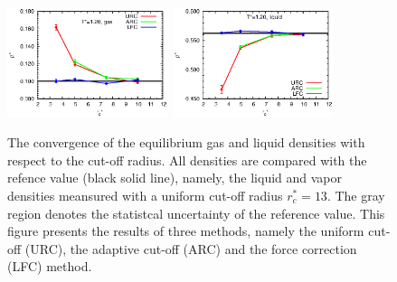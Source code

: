 \documentclass[aps,pre,preprint]{revtex4-1}
\begin{document}
\begin{figure}
  \includegraphics[width=0.42\textwidth]{fig/converge.new/t1.20.gas.eps} 
  \includegraphics[width=0.42\textwidth]{fig/converge.new/t1.20.liquid.eps} 
  \caption{The convergence of the equilibrium gas and liquid densities
    with respect to the cut-off radius. All densities are compared
    with the refence value (black solid line), namely, the liquid and
    vapor densities meansured with a uniform cut-off radius
    $r_c^\ast=13$. The gray region denotes the statistcal uncertainty
    of the reference value.  This figure presents the results of three
    methods, namely the uniform cut-off (URC), the adaptive cut-off
    (ARC) and the force correction (LFC) method. }
  \label{fig:tmp5}
\end{figure}
\end{document}
